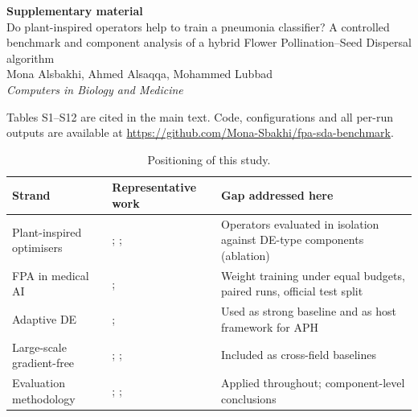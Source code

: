 \documentclass[preprint,12pt]{elsarticle}
\begin{document}
\renewcommand{\thetable}{S\arabic{table}}
\begin{center}{\Large\textbf{Supplementary material}}\\[6pt]
{\large Do plant-inspired operators help to train a pneumonia classifier? A controlled benchmark and component analysis of a hybrid Flower Pollination--Seed Dispersal algorithm}\\[6pt]
Mona Alsbakhi, Ahmed Alsaqqa, Mohammed Lubbad\\[2pt]
\emph{Computers in Biology and Medicine}\end{center}

Tables S1--S12 are cited in the main text. Code, configurations and all per-run outputs are available at \url{https://github.com/Mona-Sbakhi/fpa-sda-benchmark}.

\begin{table}[!ht]
\centering
\caption{Positioning of this study.}
\label{tab:taxonomy}
\footnotesize
\begin{tabular}{p{3.0cm}p{3.6cm}p{5.2cm}}
\toprule
Strand & Representative work & Gap addressed here \\
\midrule
Plant-inspired optimisers & \citet{yang2012fpa}; \citet{abdelbasset2019fpareview}; \citet{sulaiman2015sbppa} & Operators evaluated in isolation against DE-type components (ablation) \\
FPA in medical AI & \citet{zhou2025fpaensemble}; \citet{kaya2024fpaanfis} & Weight training under equal budgets, paired runs, official test split \\
Adaptive DE & \citet{zhang2009jade}; \citet{tanabe2013shade,tanabe2014lshade} & Used as strong baseline and as host framework for APH \\
Large-scale gradient-free & \citet{salimans2017es}; \citet{malladi2023mezo}; \citet{qiu2025esllm} & Included as cross-field baselines \\
Evaluation methodology & \citet{derrac2011tutorial}; \citet{demsar2006}; \citet{sorensen2015metaphor} & Applied throughout; component-level conclusions \\
\bottomrule
\end{tabular}
\end{table}














\end{document}
